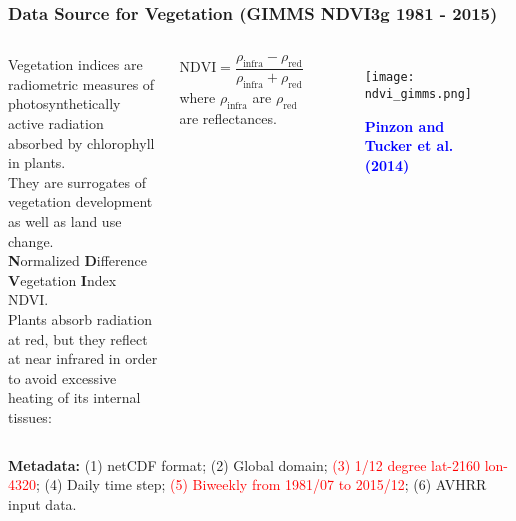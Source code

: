 \documentclass[11pt]{beamer}
\newcommand{\citat}[2]{\textbf{\textcolor{blue}{#1 et al. (#2)}}}
\begin{document}
\begin{frame}
  \frametitle{\normalsize{\textbf{
        Data Source for Vegetation (GIMMS NDVI3g 1981 - 2015)
  }}} 

  \scriptsize{
    
    \begin{columns}

      \textbullet \: Vegetation indices are radiometric
      measures of photosynthetically active radiation absorbed by chlorophyll in
      plants. \\

      \textbullet \:They are surrogates of vegetation development as well as
      land use change. \\

      \textbullet \: \textbf{N}ormalized \textbf{D}ifference \textbf{V}egetation
      \textbf{I}ndex NDVI. \\[0.10cm]  
      
      \textbullet \: Plants absorb radiation at red, but they reflect at near
      infrared in order to avoid excessive heating of its internal tissues:

      \begin{equation}
        \boxed{\text{NDVI} = \frac{\rho_{\text{infra}} -
          \rho_{\text{red}}}{\rho_{\text{infra}} + \rho_{\text{red}}} \nonumber}
      \end{equation} 
      where $\rho_{\text{infra}}$ are $\rho_{\text{red}}$ are reflectances. 
      

      \begin{figure}[h!]
        \centering
        \texttt{[image: ndvi\_gimms.png]}
        \caption*{\scriptsize{
            \citat{Pinzon and Tucker}{2014}
        }}
      \end{figure}
      
    \end{columns}

    \vspace{0.10cm}
    
    \textbf{\textbullet \: Metadata:} (1) netCDF format; (2) Global domain;
    \textcolor{red}{(3) 1/12 degree lat-2160 lon-4320}; (4) Daily time step;
    \textcolor{red}{(5) Biweekly from 1981/07 to 2015/12}; (6) AVHRR input data. 
   
  }
\end{frame}
\end{document}

